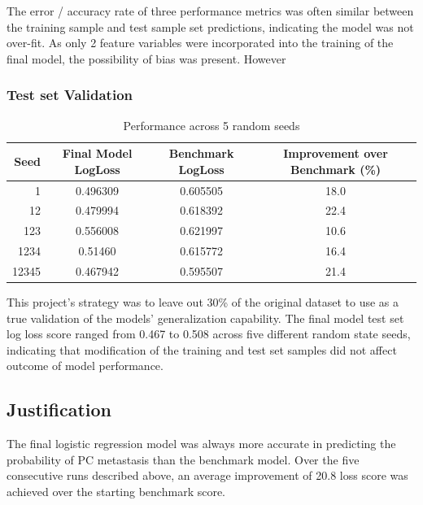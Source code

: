 \documentclass[final]{article}
\begin{document}
The error / accuracy rate of three performance metrics was often similar
between the training sample and test sample set predictions, indicating the
model was not over-fit.  As only 2 feature  variables were incorporated into the
training of the final model, the possibility of bias was present.  However

\subsubsection{Test set Validation}

\begin{table}[h]
\centering
\caption{Performance across 5 random seeds\label{tab:performance}}
\begin{tabular}[h]{ r c c c }
\hline
Seed & Final Model LogLoss & Benchmark LogLoss & Improvement over Benchmark (\%) \\  \hline
1 & 0.496309 & 0.605505 & 18.0 \\
12 & 0.479994 & 0.618392 & 22.4 \\
123 & 0.556008 & 0.621997 & 10.6 \\
1234 & 0.51460 & 0.615772 & 16.4 \\
12345 & 0.467942 & 0.595507 & 21.4 \\
\hline
\end{tabular}
\end{table}

This project's strategy was to leave out 30\% of the original dataset to use as a
true validation of the models' generalization capability.  The final model test
set log loss score ranged from 0.467 to 0.508 across five different random state
seeds, indicating that modification of the training and test set samples did not
affect outcome of model performance.

\subsection{Justification}

The final logistic regression model was always more accurate in predicting the
probability of PC  metastasis than the benchmark model.  Over the
five consecutive runs described above, an average improvement of 20.8%
loss score was achieved over the starting benchmark score.
\end{document}

